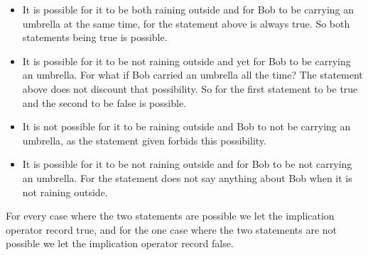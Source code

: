 \begin{itemize}
	\item It is possible for it to be both raining outside and for Bob to be carrying an umbrella at the same time, for the statement above is always true. So both statements being true is possible.
	\item It is possible for it to be not raining outside and yet for Bob to be carrying an umbrella. For what if Bob carried an umbrella all the time? The statement above does not discount that possibility. So for the first statement to be true and the second to be false is possible.
	\item It is not possible for it to be raining outside and Bob to not be carrying an umbrella, as the statement given forbids this possibility.
	\item It is possible for it to be not raining outside and for Bob to be not carrying an umbrella. For the statement does not say anything about Bob when it is not raining outside.
\end{itemize}

For every case where the two statements are possible we let the implication operator record true, and for the one case where the two statements are not possible we let the implication operator record false.